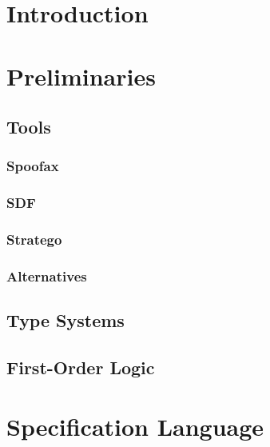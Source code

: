\documentclass[a4paper,twoside]{report}
\numberwithin{definition}{chapter}
\begin{document}


\newpage
\thispagestyle{empty}
\mbox{}



\begin{abstract}

\end{abstract}

\tableofcontents


\chapter{Introduction}

\chapter{Preliminaries}
\section{Tools}
\subsection{Spoofax}
\subsection{SDF}
\subsection{Stratego}
\subsection{Alternatives}
\section{Type Systems}
\section{First-Order Logic}


\chapter{Specification Language}
\end{document}
